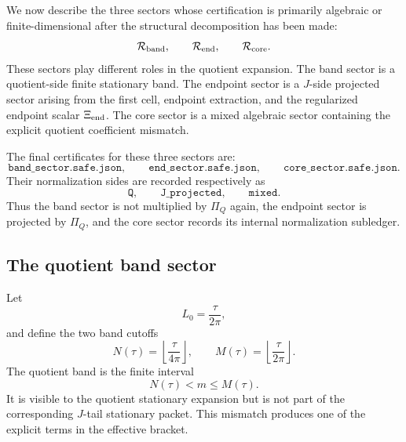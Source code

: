 \documentclass[11pt]{article}
\newcommand{\tauh}{\tau}
\newcommand{\Rband}{\mathcal R_{\rm band}}
\newcommand{\Rend}{\mathcal R_{\rm end}}
\newcommand{\Rcore}{\mathcal R_{\rm core}}
\newcommand{\PiQ}{\Pi_Q}
\newcommand{\JSON}[1]{\texttt{#1}}
\newcommand{\code}[1]{\texttt{#1}}
\begin{document}
We now describe the three sectors whose certification is primarily algebraic or
finite-dimensional after the structural decomposition has been made:
\[
        \Rband,
        \qquad
        \Rend,
        \qquad
        \Rcore.
\]
These sectors play different roles in the quotient expansion.  The band sector
is a quotient-side finite stationary band.  The endpoint sector is a
\(J\)-side projected sector arising from the first cell, endpoint extraction,
and the regularized endpoint scalar \(\Xi_{\rm end}\).  The core sector is a
mixed algebraic sector containing the explicit quotient coefficient mismatch.

The final certificates for these three sectors are:
\[
        \code{band\_sector.safe.json},
        \qquad
        \code{end\_sector.safe.json},
        \qquad
        \code{core\_sector.safe.json}.
\]
Their normalization sides are recorded respectively as
\[
        \JSON{Q},
        \qquad
        \JSON{J\_projected},
        \qquad
        \JSON{mixed}.
\]
Thus the band sector is not multiplied by \(\PiQ\) again, the endpoint sector
is projected by \(\PiQ\), and the core sector records its internal
normalization subledger.

\subsection{The quotient band sector}

Let
\[
        L_0=\frac{\tauh}{2\pi},
\]
and define the two band cutoffs
\[
        N(\tauh)
        =
        \left\lfloor\frac{\tauh}{4\pi}\right\rfloor,
        \qquad
        M(\tauh)
        =
        \left\lfloor\frac{\tauh}{2\pi}\right\rfloor.
\]
The quotient band is the finite interval
\[
        N(\tauh)<m\le M(\tauh).
\]
It is visible to the quotient stationary expansion but is not part of the
corresponding \(J\)-tail stationary packet.  This mismatch produces one of the
explicit terms in the effective bracket.
\end{document}
